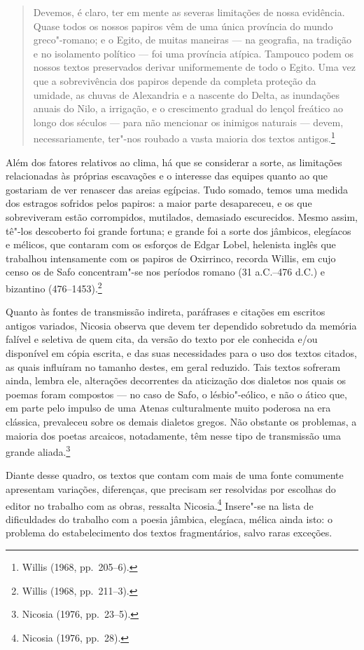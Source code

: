 \begin{quote}
Devemos, é claro, ter em mente as severas limitações de nossa evidência. Quase
todos os nossos papiros vêm de uma única província do mundo greco"-romano; e o
Egito, de muitas maneiras --- na geografia, na tradição e no isolamento político
--- foi uma província atípica. Tampouco podem os nossos textos preservados
derivar uniformemente de todo o Egito. Uma vez que a sobrevivência dos papiros
depende da completa proteção da umidade, as chuvas de Alexandria e a nascente
do Delta, as inundações anuais do Nilo, a irrigação, e o crescimento gradual do
lençol freático ao longo dos séculos --- para não mencionar os inimigos naturais
--- devem, necessariamente, ter"-nos roubado a vasta maioria dos textos antigos.\footnote{ Willis (1968, pp.~205--6).}
\end{quote}

Além dos fatores relativos ao clima, há que se considerar a sorte, as limitações
relacionadas às próprias escavações e o interesse das equipes quanto ao que
gostariam de ver renascer das areias egípcias. Tudo somado, temos uma medida
dos estragos sofridos pelos papiros: a maior parte desapareceu, e os que
sobreviveram estão corrompidos, mutilados, demasiado escurecidos. Mesmo assim,
tê"-los descoberto foi grande fortuna; e grande foi a sorte dos jâmbicos,
elegíacos e mélicos, que contaram com os esforços de Edgar Lobel, helenista
inglês que trabalhou intensamente com os papiros de Oxirrinco, recorda Willis,
em cujo censo os de Safo concentram"-se nos períodos
romano (31 a.C.--476 d.C.) e bizantino (476--1453).\footnote{ Willis (1968, pp.~211--3).}

Quanto às fontes de transmissão indireta, paráfrases e citações em escritos
antigos variados, Nicosia observa que devem ter dependido
sobretudo da memória falível e seletiva de quem cita, da versão do texto por
ele conhecida e/ou disponível em cópia escrita, e das suas necessidades para o
uso dos textos citados, as quais influíram no tamanho destes, em geral
reduzido. Tais textos sofreram ainda, lembra ele, alterações decorrentes da
aticização dos dialetos nos quais os poemas foram compostos --- no caso de Safo,
o lésbio"-eólico, e não o ático que, em parte pelo impulso de uma Atenas
culturalmente muito poderosa na era clássica, prevaleceu sobre os demais
dialetos gregos. Não obstante os problemas, a maioria dos poetas
arcaicos, notadamente, têm nesse tipo de transmissão uma grande aliada.\footnote{ Nicosia (1976, pp.~23--5).}

Diante desse quadro, os textos que contam com mais de uma fonte comumente
apresentam variações, diferenças, que precisam ser resolvidas por escolhas do
editor no trabalho com as obras, ressalta Nicosia.\footnote{ Nicosia (1976, pp.~28).} Insere"-se na lista
de dificuldades do trabalho com a poesia jâmbica, elegíaca, mélica
ainda isto: o problema do estabelecimento dos textos fragmentários, salvo raras
exceções. 

